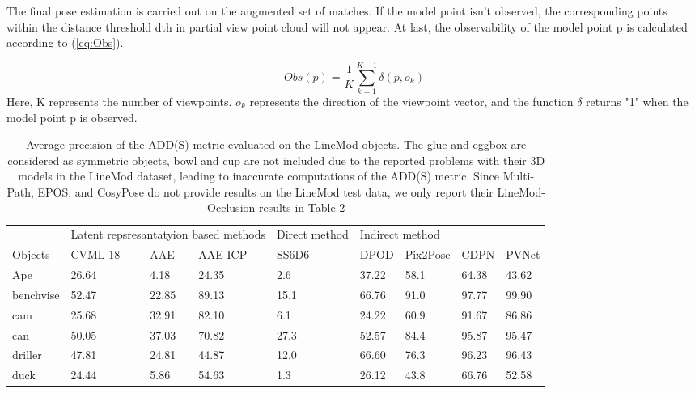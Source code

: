 \documentclass[9pt,a4paper,twoside]{tau}
\begin{document}
The final pose estimation is carried out on the augmented set of matches.
If the model point isn’t observed, the corresponding points within the distance threshold dth in partial view point cloud will not appear. At last, the observability of the model point p is calculated according to (\ref{eq:Obs}).

    \begin{equation} \label{eq:Obs}
        Obs(p) =\frac{1}{K} \sum_{k=1}^{K-1} \delta(p, o_k)
    \end{equation}
Here, K represents the number of viewpoints. $o_k$ represents the direction of the viewpoint vector, and the function  $\delta$ returns "1" when the model point p is observed.
            
    \begin{table}[H]
        \centering
        \caption{Average precision of the ADD(S) metric evaluated on the LineMod objects. The glue and eggbox are considered as symmetric objects, bowl and cup are not included due to the reported problems with their 3D models in the LineMod dataset, leading to inaccurate computations of the ADD(S) metric. Since Multi-Path, EPOS, and CosyPose do not provide results on the LineMod test data, we only report their LineMod-Occlusion results in Table 2}
    \label{tab:table}
        \begin{tabular}{lllllllll}
            & \multicolumn{3}{l}{Latent repsresantatyion based methods} & Direct method & \multicolumn{4}{l}{Indirect method} \\
Objects     & CVML-18            & AAE              & AAE-ICP           & SS6D6         & DPOD   & Pix2Pose  & CDPN   & PVNet \\
Ape         & 26.64              & 4.18             & 24.35             & 2.6           & 37.22  & 58.1      & 64.38  & 43.62 \\
benchvise   & 52.47              & 22.85            & 89.13             & 15.1          & 66.76  & 91.0      & 97.77  & 99.90 \\
cam         & 25.68              & 32.91            & 82.10             & 6.1           & 24.22  & 60.9      & 91.67  & 86.86 \\
can         & 50.05              & 37.03            & 70.82             & 27.3          & 52.57  & 84.4      & 95.87  & 95.47 \\
driller     & 47.81              & 24.81            & 44.87             & 12.0          & 66.60  & 76.3      & 96.23  & 96.43 \\
duck        & 24.44              & 5.86             & 54.63             & 1.3           & 26.12  & 43.8      & 66.76  & 52.58 \\

\end{tabular}
\end{table}
\end{document}
